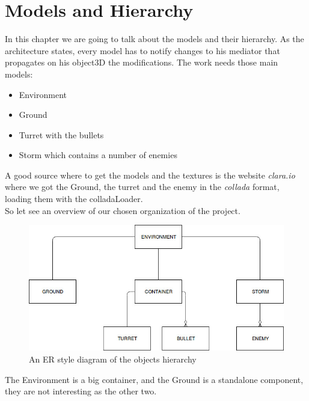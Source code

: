\section{Models and Hierarchy}
In this chapter we are going to talk about the models and their hierarchy. As the architecture states, every model has to notify changes to his mediator that propagates on his object3D the modifications. The work needs those main models:
\begin{itemize}
\item Environment
\item Ground
\item Turret with the bullets
\item Storm which contains a number of enemies
\end{itemize}
A good source where to get the models and the textures is the website \textit{clara.io} where we got the Ground, the turret and the enemy in the \textit{collada} format, loading them with the colladaLoader.\\
So let see an overview of our chosen organization of the project.
\begin{figure}[h!]
\begin{center}
\includegraphics[scale=0.5]{images/models-diagram.jpg}
\caption{An ER style diagram of the objects hierarchy}
\end{center}
\end{figure}
The Environment is a big container, and the Ground is a standalone component, they are not interesting as the other two.
\newpage

